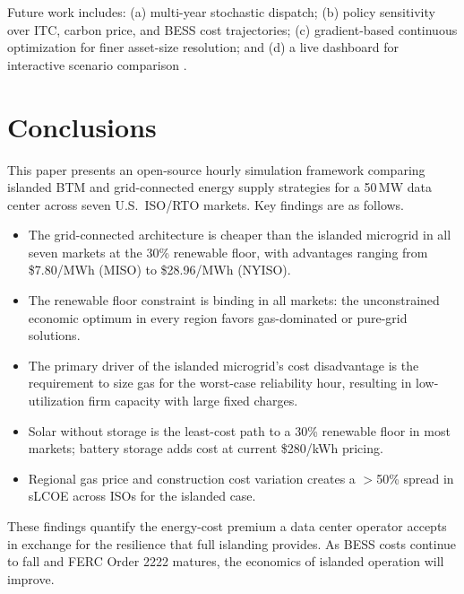 \documentclass[conference]{IEEEtran}
\begin{document}
Future work includes: (a) multi-year stochastic dispatch; (b) policy
sensitivity over ITC, carbon price, and BESS cost trajectories; (c)
gradient-based continuous optimization for finer asset-size resolution; and
(d) a live dashboard for interactive scenario comparison \cite{b9}.

\section{Conclusions}
\label{sec:conclusions}

This paper presents an open-source hourly simulation framework comparing
islanded BTM and grid-connected energy supply strategies for a 50\,MW data
center across seven U.S.\ ISO/RTO markets.
Key findings are as follows.

\begin{itemize}
\item The grid-connected architecture is cheaper than the islanded microgrid
in all seven markets at the 30\% renewable floor, with advantages ranging
from \$7.80/MWh (MISO) to \$28.96/MWh (NYISO).

\item The renewable floor constraint is binding in all markets: the
unconstrained economic optimum in every region favors gas-dominated or
pure-grid solutions.

\item The primary driver of the islanded microgrid's cost disadvantage is
the requirement to size gas for the worst-case reliability hour, resulting in
low-utilization firm capacity with large fixed charges.

\item Solar without storage is the least-cost path to a 30\% renewable floor
in most markets; battery storage adds cost at current \$280/kWh pricing.

\item Regional gas price and construction cost variation creates a $>$50\%
spread in sLCOE across ISOs for the islanded case.
\end{itemize}

These findings quantify the energy-cost premium a data center operator accepts
in exchange for the resilience that full islanding provides.
As BESS costs continue to fall and FERC Order 2222 matures, the economics of
islanded operation will improve.

\end{document}
